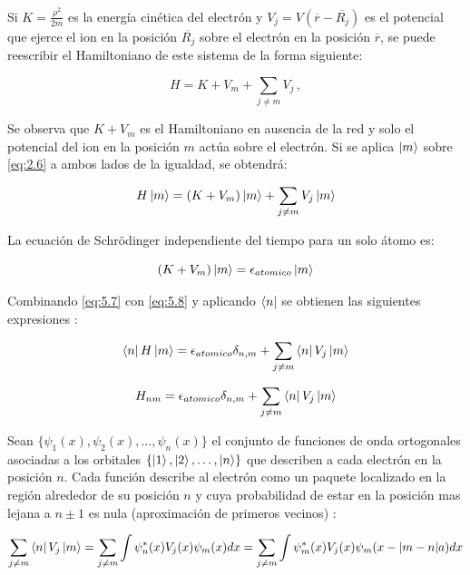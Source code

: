 Si $K=\frac{\rho^2}{2m}$ es la energía cinética del electrón y $V_j=V(\overline{r}-\overline{R_j})$ es el potencial que ejerce el ion en la posición $\overline{R_j}$ sobre el electrón en la posición $\overline{r}$, se puede reescribir el Hamiltoniano de este sistema de la forma siguiente:

\begin{equation}\label{eq:5.6}
    H=K+V_m+\sum_{j \neq m } V_j\,,
\end{equation}

Se observa que $K+V_m$ es el Hamiltoniano en ausencia de la red y solo el potencial del ion en la posición $m$ actúa sobre el electrón. Si se aplica $\ket{m}$ sobre \ref{eq:2.6} a ambos lados de la igualdad, se obtendrá:

\begin{equation}\label{eq:5.7}
    H\ket{m}=(K+V_m)\ket{m}+\sum_{j \neq m}V_j\ket{m}
\end{equation}

La ecuación de Schrödinger independiente del tiempo para un solo átomo es: 

\begin{equation}\label{eq:5.8}
    (K+V_m)\ket{m}=\epsilon_{atomico}\ket{m}
\end{equation}

Combinando \ref{eq:5.7} con \ref{eq:5.8} y aplicando $\bra{n}$ se obtienen las siguientes expresiones :

\begin{equation}\label{eq:5.9}
    \bra{n}H\ket{m}=\epsilon_{atomico}\delta_{n,m}+\sum_{j \neq m}\bra{n}V_j\ket{m}
\end{equation}

\begin{equation}\label{eq:5.10}
    H_{nm}=\epsilon_{atomico}\delta_{n,m}+\sum_{j \neq m}\bra{n}V_j\ket{m}
\end{equation}

Sean $\{\psi_1(x),\psi_2(x),\dots,\psi_n(x)\}$ el conjunto de funciones de onda ortogonales asociadas a los orbitales $\{\ket{1},\ket{2},\dots,\ket{n}\}$ que describen a cada electrón en la posición $n$. Cada función describe al electrón como un paquete localizado en la región alrededor de su posición $n$ y cuya probabilidad de estar en la posición mas lejana a $n \pm 1$ es nula (aproximación de primeros vecinos) \cite{ashc}:

\begin{equation}\label{eq:5.11}
    \sum_{j \neq m}\bra{n}V_j\ket{m}=\sum_{j \neq m}\int \psi_n^{*}(x)V_j(x)\psi_m(x)dx=\sum_{j \neq m}\int \psi_m^{*}(x)V_j(x)\psi_m(x-\abs{m-n}a)dx
\end{equation}


